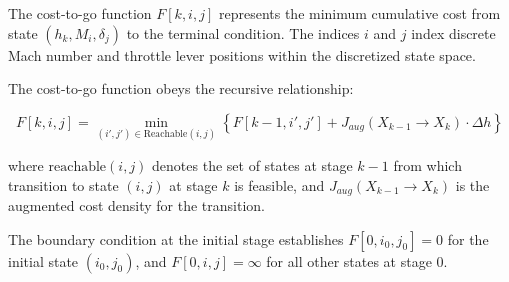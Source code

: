 
The cost-to-go function $F[k, i, j]$ represents the minimum cumulative cost from state $(h_k, M_i, \delta_j)$ to the terminal condition. The indices $i$ and $j$ index discrete Mach number and throttle lever positions within the discretized state space.

The cost-to-go function obeys the recursive relationship:

\begin{equation}
F[k, i, j] = \min_{(i', j') \in \text{Reachable}(i,j)} \left\{ F[k-1, i', j'] + J_{aug}(X_{k-1} \to X_k) \cdot \Delta h \right\}
\end{equation}

where $\text{reachable}(i,j)$ denotes the set of states at stage $k-1$ from which transition to state $(i,j)$ at stage $k$ is feasible, and $J_{aug}(X_{k-1} \to X_k)$ is the augmented cost density for the transition.

The boundary condition at the initial stage establishes $F[0, i_0, j_0] = 0$ for the initial state $(i_0, j_0)$, and $F[0, i, j] = \infty$ for all other states at stage 0.
